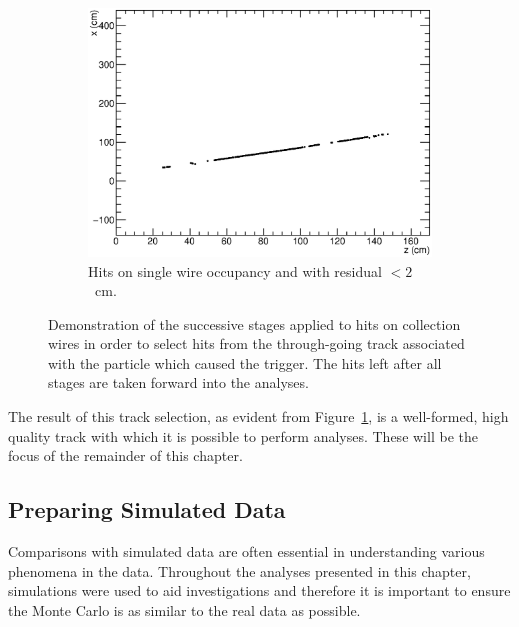 \begin{figure}
\begin{subfigure}[t]{0.48\linewidth}
    \centering
    \includegraphics[width=\textwidth]{hitselection_final.eps}
    \caption{Hits on single wire occupancy and with residual $<2$~cm.}
    \label{fig:TrackSelectionFinal}
  \end{subfigure}
  \caption[Selecting tracks for 35~ton data analysis]{Demonstration of the successive stages applied to hits on collection wires in order to select hits from the through-going track associated with the particle which caused the trigger.  The hits left after all stages are taken forward into the analyses.}
  \label{fig:TrackSelection}
\end{figure}

The result of this track selection, as evident from Figure~\ref{fig:TrackSelectionFinal}, is a well-formed, high quality track with which it is possible to perform analyses.  These will be the focus of the remainder of this chapter.

\subsection{Preparing Simulated Data}\label{sec:SimulatedData}

Comparisons with simulated data are often essential in understanding various phenomena in the data.  Throughout the analyses presented in this chapter, simulations were used to aid investigations and therefore it is important to ensure the Monte Carlo is as similar to the real data as possible.

